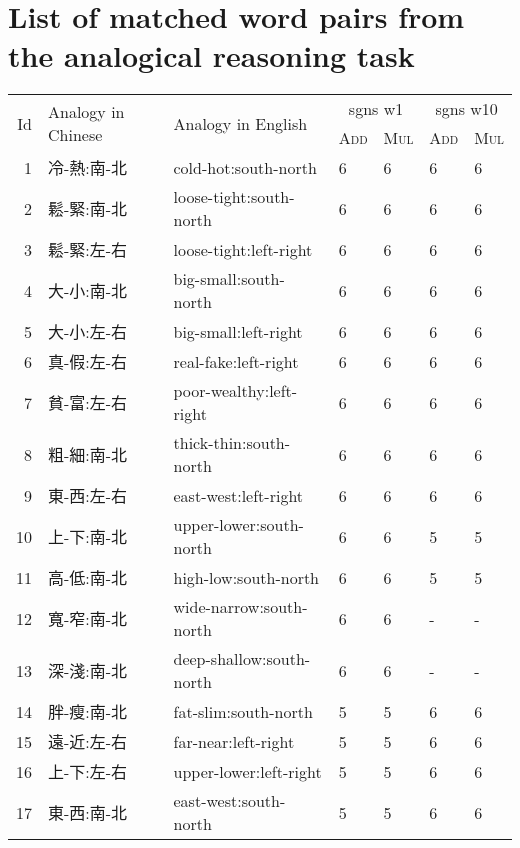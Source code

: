 \chapter{List of matched word pairs from the analogical reasoning task}

\begin{longtable}[c]{rllllll}
        \toprule
        \multirow{2}{*}{Id} &
        \multirow{2}{*}{Analogy in Chinese} &
        \multirow{2}{*}{Analogy in English} &
        \multicolumn{2}{c}{\gls{sgns} w1} &
        \multicolumn{2}{c}{\gls{sgns} w10} \\
        \cmidrule{4-7}
        &&&
        \textsc{Add} & \textsc{Mul} &
        \textsc{Add} & \textsc{Mul} \\
        \midrule
        1 & 冷-熱:南-北 & cold-hot:south-north     & 6 & 6 & 6 & 6 \\
        2 & 鬆-緊:南-北 & loose-tight:south-north  & 6 & 6 & 6 & 6 \\
        3 & 鬆-緊:左-右 & loose-tight:left-right   & 6 & 6 & 6 & 6 \\
        4 & 大-小:南-北 & big-small:south-north    & 6 & 6 & 6 & 6 \\
        5 & 大-小:左-右 & big-small:left-right     & 6 & 6 & 6 & 6 \\
        6 & 真-假:左-右 & real-fake:left-right     & 6 & 6 & 6 & 6 \\
        7 & 貧-富:左-右 & poor-wealthy:left-right  & 6 & 6 & 6 & 6 \\
        8 & 粗-細:南-北 & thick-thin:south-north   & 6 & 6 & 6 & 6 \\
        9 & 東-西:左-右 & east-west:left-right     & 6 & 6 & 6 & 6 \\
        10 & 上-下:南-北 & upper-lower:south-north  & 6 & 6 & 5 & 5 \\
        11 & 高-低:南-北 & high-low:south-north     & 6 & 6 & 5 & 5 \\
        12 & 寬-窄:南-北 & wide-narrow:south-north  & 6 & 6 & - & - \\
        13 & 深-淺:南-北 & deep-shallow:south-north & 6 & 6 & - & - \\
        14 & 胖-瘦:南-北 & fat-slim:south-north     & 5 & 5 & 6 & 6 \\
        15 & 遠-近:左-右 & far-near:left-right      & 5 & 5 & 6 & 6 \\
        16 & 上-下:左-右 & upper-lower:left-right   & 5 & 5 & 6 & 6 \\
        17 & 東-西:南-北 & east-west:south-north    & 5 & 5 & 6 & 6 \\

\end{longtable}
